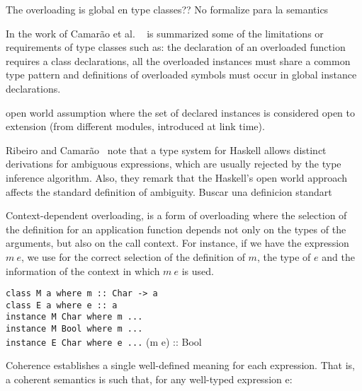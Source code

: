 \documentclass[hidelinks, twocolumn]{article}
\begin{document}
The overloading is global en type classes??
 No formalize para la semantics
 
In the work of Camar\~ao et al. ~\cite{Camarao1999} is summarized some of the limitations or requirements of type classes such as: the declaration of an overloaded function requires a class declarations, all the overloaded instances must share a common type pattern and definitions of overloaded symbols must occur in global instance declarations.

open world assumption where the
set of declared instances is considered open to extension (from different modules,
introduced at link time).


Ribeiro and Camar\~ao~\cite{Ribeiro2013} note that a type system for Haskell allows distinct derivations for ambiguous expressions, which are usually rejected by the type inference algorithm. Also, they remark that the Haskell's open world approach affects the standard definition of ambiguity. Buscar una definicion standart


Context-dependent overloading, is a form of overloading where the selection of the definition for an application function depends not only on the types of the arguments, but also on the call context. For instance,  if we have the  expression $m \ e$, we use for the correct selection of the definition of $m$, the type of $e$ and the information of the context in which  $m \ e$ is used.

\texttt{class M a where m :: Char -> a\\
class E a where e :: a\\
instance M Char where m ...\\
instance M Bool where m ...\\
instance E Char where e ...}
(m e) :: Bool


Coherence establishes a single well-defined meaning for each expression. That is, a coherent semantics is such that, for any well-typed expression e:
\end{document}
